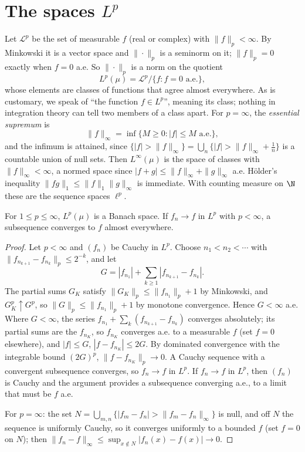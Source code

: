 \section{The spaces \texorpdfstring{$L^p$}{Lp}}

Let $\mathcal L^p$ be the set of measurable $f$ (real or complex) with $\|f\|_p<\infty$. By Minkowski it is a vector space and $\|\cdot\|_p$ is a seminorm on it; $\|f\|_p=0$ exactly when $f=0$
a.e. So $\|\cdot\|_p$ is a norm on the quotient
\[L^p(\mu)=\mathcal L^p/\{f:f=0\text{ a.e.}\},\]
whose elements are classes of functions that agree almost everywhere. As is customary, we speak of ``the function $f\in L^p$'', meaning its class; nothing in integration theory can tell
two members of a class apart. For $p=\infty$, the \emph{essential supremum} is
\[\|f\|_\infty=\inf\{M\ge0:|f|\le M\text{ a.e.}\},\]
and the infimum is attained, since $\{|f|>\|f\|_\infty\}=\bigcup_n\{|f|>\|f\|_\infty+\frac1n\}$ is a countable union of null sets. Then $L^\infty(\mu)$ is the space of classes with $\|f\|_\infty<\infty$, a normed space
since $|f+g|\le\|f\|_\infty+\|g\|_\infty$ a.e. H\"older's inequality $\|fg\|_1\le\|f\|_1\|g\|_\infty$ is immediate. With counting measure on $\N$ these are the sequence spaces $\ell^p$.

\begin{theorem}\label{thm:rieszfischer}
For $1\le p\le\infty$, $L^p(\mu)$ is a Banach space. If $f_n\to f$ in $L^p$ with $p<\infty$, a subsequence converges to $f$ almost everywhere.
\end{theorem}
\begin{proof}
Let $p<\infty$ and $(f_n)$ be Cauchy in $L^p$. Choose $n_1<n_2<\cdots$ with $\|f_{n_{k+1}}-f_{n_k}\|_p\le2^{-k}$, and let
\[G=|f_{n_1}|+\sum_{k\ge1}|f_{n_{k+1}}-f_{n_k}|.\]
The partial sums $G_K$ satisfy $\|G_K\|_p\le\|f_{n_1}\|_p+1$ by Minkowski, and $G_K^p\uparrow G^p$, so $\|G\|_p\le\|f_{n_1}\|_p+1$ by monotone convergence. Hence $G<\infty$ a.e. Where $G<\infty$, the series
$f_{n_1}+\sum_k(f_{n_{k+1}}-f_{n_k})$ converges absolutely; its partial sums are the $f_{n_K}$, so $f_{n_K}$ converges a.e. to a measurable $f$ (set $f=0$ elsewhere), and $|f|\le G$, $|f-f_{n_K}|\le2G$. By
dominated convergence with the integrable bound $(2G)^p$, $\|f-f_{n_K}\|_p\to0$. A Cauchy sequence with a convergent subsequence converges, so $f_n\to f$ in $L^p$. If $f_n\to f$ in $L^p$, then $(f_n)$ is Cauchy and
the argument provides a subsequence converging a.e., to a limit that must be $f$ a.e.

For $p=\infty$: the set $N=\bigcup_{m,n}\{|f_m-f_n|>\|f_m-f_n\|_\infty\}$ is null, and off $N$ the sequence is uniformly Cauchy, so it converges uniformly to a bounded $f$ (set $f=0$ on $N$); then
$\|f_n-f\|_\infty\le\sup_{x\notin N}|f_n(x)-f(x)|\to0$.
\end{proof}


